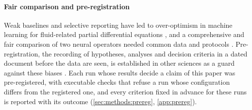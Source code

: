 \paragraph{Fair comparison and pre-registration}
Weak baselines and selective reporting have led to over-optimism in machine learning for
fluid-related partial differential equations \cite{McGreivy2024}, and a comprehensive and
fair comparison of two neural operators needed common data and protocols
\cite{Lu2022Fair}. Pre-registration, the recording of hypotheses, analyses and decision
criteria in a dated document before the data are seen, is established in other sciences as
a guard against these biases \cite{Nosek2018}. Each run whose results decide a claim of
this paper was pre-registered, with executable checks that refuse a run whose configuration
differs from the registered one, and every criterion fixed in advance for these runs is
reported with its outcome (\cref{sec:methods:prereg}, \ref{app:prereg}).
